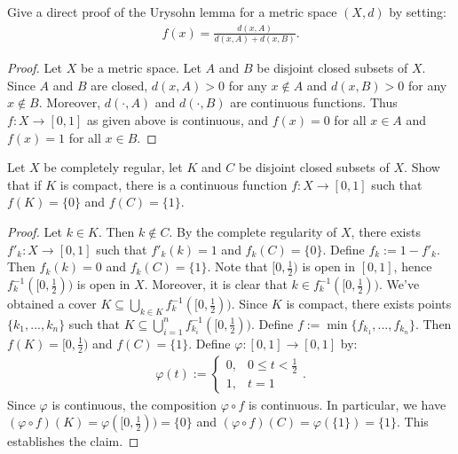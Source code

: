 \documentclass[10pt,twoside,openany]{memoir}
\begin{document}
\begin{problem}[manual-num={33.3}]
Give a direct proof of the Urysohn lemma for a metric space $(X,d)$ by setting:
    \begin{equation*}
    \begin{split}
        f(x) = \frac{d(x,A)}{d(x,A) + d(x,B)}.
    \end{split}
    \end{equation*}
\end{problem}
\begin{proof}
Let $X$ be a metric space. Let $A$ and $B$ be disjoint closed subsets of $X$. Since $A$ and $B$ are closed, $d(x,A) > 0$ for any $x \not\in A$ and $d(x,B) > 0$ for any $x \not\in B$. Moreover, $d(\cdot,A)$ and $d(\cdot,B)$ are continuous functions. Thus $f:X \rightarrow [0,1]$ as given above is continuous, and $f(x) = 0$ for all $x \in A$ and $f(x) = 1$ for all $x \in B$.
\end{proof}

\begin{problem}[manual-num={33.8}]
Let $X$ be completely regular, let $K$ and $C$ be disjoint closed subsets of $X$. Show that if $K$ is compact, there is a continuous function $f:X \rightarrow [0,1]$ such that $f(K) = \{0\}$ and $f(C) = \{1\}$.
\end{problem}
   \begin{proof}
    Let $k \in K$. Then $k \not\in C$. By the complete regularity of $X$, there exists $f'_k:X \rightarrow [0,1]$ such that $f'_k(k) = 1$ and $f_k(C) = \{0\}$. Define $f_k:= 1- f'_k$. Then $f_k(k) = 0$ and $f_k(C) = \{1\}$. Note that $[0,\frac{1}{2})$ is open in $[0,1]$, hence $f_k^{-1}([0,\frac{1}{2}))$ is open in $X$. Moreover, it is clear that $k \in f_k^{-1}([0,\frac{1}{2}))$. We've obtained a cover $K \subseteq \bigcup_{k \in K}f_k^{-1}([0,\frac{1}{2}))$. Since $K$ is compact, there exists points $\{k_1,...,k_n\}$ such that $K \subseteq \bigcup_{i = 1}^n f_{k_i}^{-1}([0,\frac{1}{2}))$. Define $f := \min \{f_{k_1},...,f_{k_n}\}$. Then $f(K) = [0,\frac{1}{2})$ and $f(C) = \{1\}$. Define $\varphi:[0,1] \rightarrow [0,1]$ by:
        \begin{equation*}
        \begin{split}
            \varphi(t):=
            \begin{cases}
            0,& 0 \leq t < \frac{1}{2} \\
            1, & t = 1
            \end{cases}.
        \end{split}
        \end{equation*}
    Since $\varphi$ is continuous, the composition $\varphi \circ f$ is continuous. In particular, we have $(\varphi \circ f)(K) = \varphi([0,\frac{1}{2})) = \{0\}$ and $(\varphi \circ f)(C) = \varphi(\{1\}) = \{1\}$. This establishes the claim.
   \end{proof}
\end{document}
